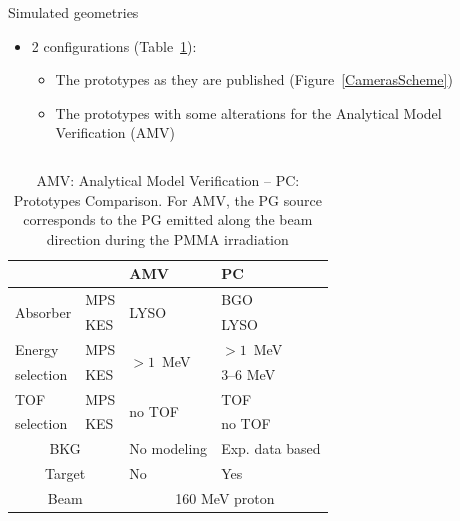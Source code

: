 \documentclass[final]{beamer} %
\begin{document}
\begin{frame}{}
\begin{columns}[t]
\begin{column}{0.49\textwidth}
\begin{block}{Simulated geometries}
					\begin{itemize}
						\item 2 configurations (Table~\ref{CamerasParameters}):
						\begin{itemize}
							\item The prototypes as they are published (Figure~\ref{CamerasScheme})
							\item The prototypes with some alterations for the Analytical Model Verification (AMV)
						\end{itemize}

					\end{itemize}		
			\begin{columns}[t]

				
				\begin{column}{0.49\textwidth}			
			
					\begin{table}[h]
						\centering
						\small
						\begin{tabular}{|l|l|l|l|}
							\hline
							\multicolumn{2}{|c|}{}& 	AMV  & PC\\
							\hline
							\multirow{2}{*}{Absorber}	& MPS & \multirow{2}{*}{LYSO} 							& BGO \\
							\cline{2-2}\cline{4-4}
															& KES & 																& LYSO \\
							\hline
							Energy & MPS & \multirow{2}{*}{$>1$~MeV}			&	$>1$~MeV						\\
							\cline{2-2}\cline{4-4}
							selection				& KES & & 3--6 MeV \\
							\hline	
							TOF & MPS & \multirow{2}{*}{no TOF}			&		TOF						\\
							\cline{2-2}\cline{4-4}
							selection				& KES & & no TOF \\
							\hline		
							\multicolumn{2}{|c|}{BKG} & No modeling & Exp. data based   \\
							\hline
							\multicolumn{2}{|c|}{Target} & No & Yes   \\			
							\hline
							\multicolumn{2}{|c|}{Beam} & \multicolumn{2}{|c|}{160 MeV proton}   \\								
							\hline		
						\end{tabular}
						\caption{AMV: Analytical Model Verification -- PC: Prototypes Comparison. For AMV, the PG source corresponds to the PG emitted along the beam direction during the PMMA irradiation }
						\label{CamerasParameters}
						\end{table}
				\end{column}			


\end{columns}
\end{block}
\end{column}
\end{columns}
\end{frame}
\end{document}
